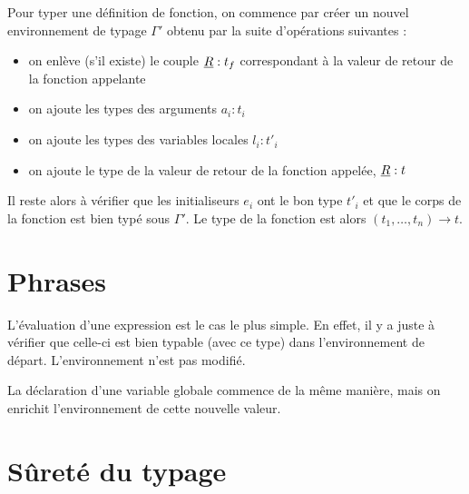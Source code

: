 Pour typer une définition de fonction, on commence par créer un nouvel
environnement de typage $Γ'$ obtenu par la suite d'opérations suivantes :

\begin{itemize}
\item
  on enlève (s'il existe) le couple $\vRet : t_f$ correspondant à la
  valeur de retour de la fonction appelante
\item
  on ajoute les types des arguments $a_i : t_i$
\item
  on ajoute les types des variables locales $l_i : t'_i$
\item
  on ajoute le type de la valeur de retour de la fonction appelée,
  $\vRet : t$
\end{itemize}

Il reste alors à vérifier que les initialiseurs $e_i$ ont le bon type $t'_i$ et
que le corps de la fonction est bien typé sous $Γ'$. Le type de la fonction est
alors $(t_1, …, t_n) → t$.

\begin{mathpar}
\end{mathpar}

\section{Phrases}

L'évaluation d'une expression est le cas le plus simple. En effet, il y a juste
à vérifier que celle-ci est bien typable (avec ce type) dans l'environnement de
départ. L'environnement n'est pas modifié.

\begin{mathpar}
\end{mathpar}

La déclaration d'une variable globale commence de la même manière, mais on
enrichit l'environnement de cette nouvelle valeur.

\begin{mathpar}
\end{mathpar}

\begin{mathpar}
\end{mathpar}


\section{Sûreté du typage}

